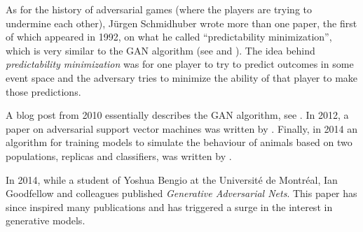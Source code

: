 As for the history of adversarial games (where the players are trying
to undermine each other), J\"{u}rgen Schmidhuber wrote more than one
paper, the first of which appeared in 1992, on what he called
``predictability minimization'', which is very similar to the GAN
algorithm (see \cite{ref:schmidhuber-1992} and
\cite{ref:schmidhuber-2018}). The idea behind \textit{predictability
minimization} was for one player to try to predict outcomes in some
event space and the adversary tries to minimize the ability of that
player to make those predictions.

A blog post from 2010 essentially describes the GAN algorithm, see
\cite{ref:niemitalo-2010}. In 2012, a paper on adversarial support
vector machines was written by \cite{ref:zhou-2012}. Finally, in 2014
an algorithm for training models to simulate the behaviour of animals
based on two populations, replicas and classifiers, was written by
\cite{ref:li-2014}.

In 2014, while a student of Yoshua Bengio at the Universit\'{e} de
Montr\'{e}al, Ian Goodfellow and colleagues published
\textit{Generative Adversarial Nets}.  This paper has since inspired
many publications and has triggered a surge in the interest in
generative models.


